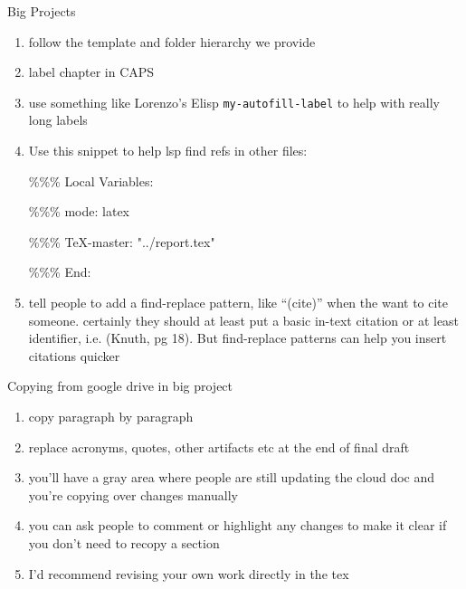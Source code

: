 \documentclass[12pt]{article}
\begin{document}
Big Projects
\begin{enumerate}
  \item follow the template and folder hierarchy we provide
  \item label chapter in CAPS
  \item use something like Lorenzo's Elisp \texttt{my-autofill-label} to help with really long labels
  \item Use this snippet to help lsp find refs in other files:

        \%\%\% Local Variables:

        \%\%\% mode: latex

        \%\%\% TeX-master: "../report.tex"

        \%\%\% End:
  \item tell people to add a find-replace pattern, like ``(cite)'' when the want to cite someone. certainly they should at least put a basic in-text citation or at least identifier, i.e. (Knuth, pg 18). But find-replace patterns can help you insert citations quicker
\end{enumerate}



Copying from google drive in big project
\begin{enumerate}
  \item copy paragraph by paragraph
  \item replace acronyms, quotes, other artifacts etc at the end of final draft
  \item you'll have a gray area where people are still updating the cloud doc and you're copying over changes manually
  \item you can ask people to comment or highlight any changes to make it clear if you don't need to recopy a section
  \item I'd recommend revising your own work directly in the tex
\end{enumerate}
\end{document}
